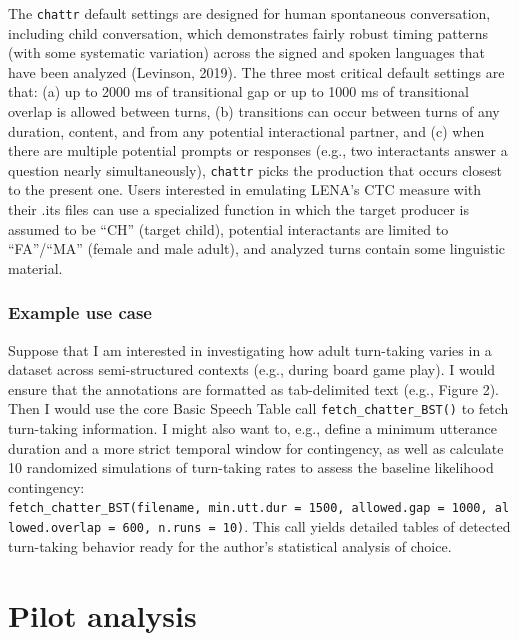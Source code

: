 \documentclass[10pt, letterpaper]{article}
\begin{document}
The \texttt{chattr} default settings are designed for human spontaneous
conversation, including child conversation, which demonstrates fairly
robust timing patterns (with some systematic variation) across the
signed and spoken languages that have been analyzed (Levinson, 2019).
The three most critical default settings are that: (a) up to 2000 ms of
transitional gap or up to 1000 ms of transitional overlap is allowed
between turns, (b) transitions can occur between turns of any duration,
content, and from any potential interactional partner, and (c) when
there are multiple potential prompts or responses (e.g., two
interactants answer a question nearly simultaneously), \texttt{chattr}
picks the production that occurs closest to the present one. Users
interested in emulating LENA's CTC measure with their .its files can use
a specialized function in which the target producer is assumed to be
``CH'' (target child), potential interactants are limited to
``FA''/``MA'' (female and male adult), and analyzed turns contain some
linguistic material.

\hypertarget{example-use-case}{%
\subsubsection{Example use case}\label{example-use-case}}

Suppose that I am interested in investigating how adult turn-taking
varies in a dataset across semi-structured contexts (e.g., during board
game play). I would ensure that the annotations are formatted as
tab-delimited text (e.g., Figure 2). Then I would use the core Basic
Speech Table call \texttt{fetch\_chatter\_BST()} to fetch turn-taking
information. I might also want to, e.g., define a minimum utterance
duration and a more strict temporal window for contingency, as well as
calculate 10 randomized simulations of turn-taking rates to assess the
baseline likelihood contingency:
\texttt{fetch\_chatter\_BST(filename,\ min.utt.dur\ =\ 1500,\ allowed.gap\ =\ 1000,\ allowed.overlap\ =\ 600,\ n.runs\ =\ 10)}.
This call yields detailed tables of detected turn-taking behavior ready
for the author's statistical analysis of choice.

\hypertarget{pilot-analysis}{%
\section{Pilot analysis}\label{pilot-analysis}}
\end{document}
